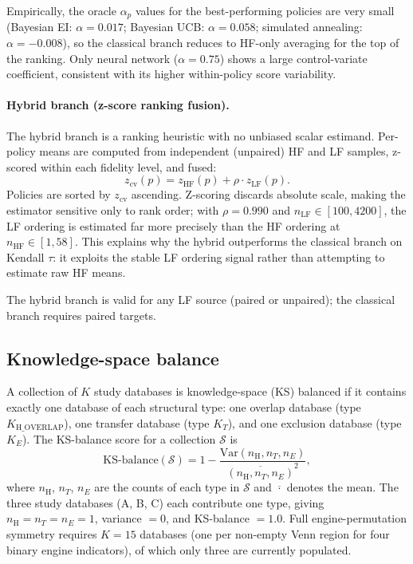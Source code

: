 \documentclass[twoside,twocolumn,9pt]{article}
\begin{document}
Empirically, the oracle $\alpha_p$ values for the best-performing policies are very small (Bayesian EI: $\alpha=0.017$; Bayesian UCB: $\alpha=0.058$; simulated annealing: $\alpha=-0.008$), so the classical branch reduces to HF-only averaging for the top of the ranking.  Only neural network ($\alpha=0.75$) shows a large control-variate coefficient, consistent with its higher within-policy score variability.

\paragraph{Hybrid branch (z-score ranking fusion).}
The hybrid branch is a ranking heuristic with no unbiased scalar estimand.  Per-policy means are computed from independent (unpaired) HF and LF samples, z-scored within each fidelity level, and fused:
\[
z_\mathrm{cv}(p) = z_\mathrm{HF}(p) + \rho \cdot z_\mathrm{LF}(p).
\]
Policies are sorted by $z_\mathrm{cv}$ ascending.  Z-scoring discards absolute scale, making the estimator sensitive only to rank order; with $\rho = 0.990$ and $n_\mathrm{LF} \in [100, 4200]$, the LF ordering is estimated far more precisely than the HF ordering at $n_\mathrm{HF} \in [1, 58]$.  This explains why the hybrid outperforms the classical branch on Kendall $\tau$: it exploits the stable LF ordering signal rather than attempting to estimate raw HF means.

The hybrid branch is valid for any LF source (paired or unpaired); the classical branch requires paired targets.

\subsection{Knowledge-space balance}

A collection of $K$ study databases is knowledge-space (KS) balanced if it contains exactly one database of each structural type: one overlap database (type $K_{\mathrm{H\_OVERLAP}}$), one transfer database (type $K_T$), and one exclusion database (type $K_E$). The KS-balance score for a collection $\mathcal{S}$ is
\[
\mathrm{KS\text{-}balance}(\mathcal{S}) = 1 - \frac{\mathrm{Var}(n_{\mathrm{H}}, n_T, n_E)}{\overline{(n_{\mathrm{H}}, n_T, n_E)}^2},
\]
where $n_{\mathrm{H}}$, $n_T$, $n_E$ are the counts of each type in $\mathcal{S}$ and $\overline{\cdot}$ denotes the mean. The three study databases (A, B, C) each contribute one type, giving $n_{\mathrm{H}} = n_T = n_E = 1$, variance $= 0$, and KS-balance $= 1.0$. Full engine-permutation symmetry requires $K = 15$ databases (one per non-empty Venn region for four binary engine indicators), of which only three are currently populated.
\end{document}
